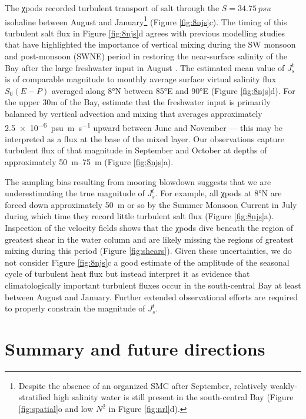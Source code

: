 \documentclass[onecol]{ametsoc}
\begin{document}
The χpods recorded turbulent transport of salt through the \(S=\SI{34.75}{psu}\) isohaline between August and January\footnote{Despite the absence of an organized SMC after September, relatively weakly-stratified high salinity water is still present in the south-central Bay (Figure \ref{fig:spatial}o and low \(N^2\) in Figure \ref{fig:nrl}d).} (Figure \ref{fig:8njs}c).
The timing of this turbulent salt flux in Figure \ref{fig:8njs}d agrees with previous modelling studies that have highlighted the importance of vertical mixing during the SW monsoon and post-monsoon (SWNE) period in restoring the near-surface salinity of the Bay after the large freshwater input in August \citep{Benshila2014,Akhil2014,Wilson2016a}.
The estimated mean value of \(J_s^t\) is of comparable magnitude to monthly average surface virtual salinity flux \(S_0(E-P)\) averaged along 8°N between 85°E and 90°E (Figure \ref{fig:8njs}d).
For the upper 30m of the Bay, \cite{Wilson2016a} estimate that the freshwater input is primarily balanced by vertical advection and mixing that averages approximately \SI{2.5e-6}{psu \m\per\s} upward between June and November --- this may be interpreted as a flux at the base of the mixed layer.
Our observations capture turbulent flux of that magnitude in September and October at depths of approximately \SIrange{50}{75}{m} (Figure \ref{fig:8njs}a).

The sampling bias resulting from mooring blowdown suggests that we are underestimating the true magnitude of $J_s^t$.
For example, all χpods at 8°N are forced down approximately \SI{50}{m} or so by the Summer Monsoon Current in July during which time they record little turbulent salt flux (Figure \ref{fig:8njs}a).
Inspection of the velocity fields shows that the χpods dive beneath the region of greatest shear in the water column and are likely missing the regions of greatest mixing during this period (Figure \ref{fig:shears}).
Given these uncertainties, we do not consider Figure \ref{fig:8njs}c a good estimate of the amplitude of the seasonal cycle of turbulent heat flux but instead interpret it as evidence that climatologically important turbulent fluxes occur in the south-central Bay at least between August and January.
Further extended observational efforts are required to properly constrain the magnitude of $J_s^t$.

\section{Summary and future directions}
\label{sec:org3230bcc}
\end{document}
